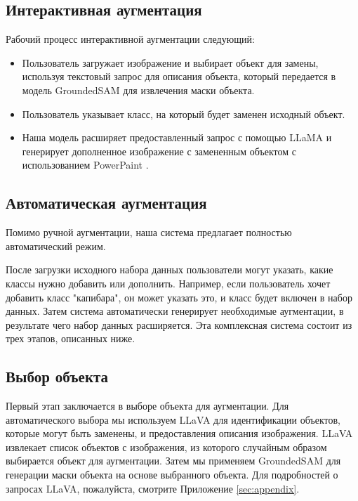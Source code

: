 \documentclass[11pt]{article}
\begin{document}

\subsection{Интерактивная аугментация}

Рабочий процесс интерактивной аугментации следующий:

\begin{itemize}
    \item Пользователь загружает изображение и выбирает объект для замены, используя текстовый запрос для описания объекта, который передается в модель GroundedSAM \cite{ren2024grounded} для извлечения маски объекта.
    \item Пользователь указывает класс, на который будет заменен исходный объект.
    \item Наша модель расширяет предоставленный запрос с помощью LLaMA \cite{dubey2024llama} и генерирует дополненное изображение с замененным объектом с использованием PowerPaint \cite{zhuang2023task}.
\end{itemize}

\subsection{Автоматическая аугментация}

Помимо ручной аугментации, наша система предлагает полностью автоматический режим.

После загрузки исходного набора данных пользователи могут указать, какие классы нужно добавить или дополнить. Например, если пользователь хочет добавить класс "капибара", он может указать это, и класс будет включен в набор данных. Затем система автоматически генерирует необходимые аугментации, в результате чего набор данных расширяется. Эта комплексная система состоит из трех этапов, описанных ниже.

\subsection{Выбор объекта}

Первый этап заключается в выборе объекта для аугментации. Для автоматического выбора мы используем LLaVA \cite{liu2024llavanext} для идентификации объектов, которые могут быть заменены, и предоставления описания изображения. LLaVA извлекает список объектов с изображения, из которого случайным образом выбирается объект для аугментации. Затем мы применяем GroundedSAM \cite{kirillov2023segment} для генерации маски объекта на основе выбранного объекта. Для подробностей о запросах LLaVA, пожалуйста, смотрите Приложение \ref{sec:appendix}.
\end{document}
